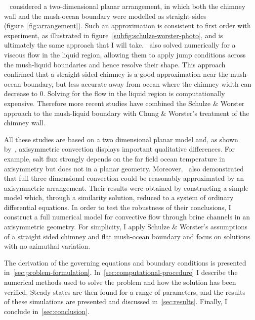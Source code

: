 \documentclass[11pt]{proc}
\begin{document}

~\citet*{schulze-worster-98} considered a two-dimensional planar arrangement, in which both the chimney wall and the mush-ocean boundary were modelled as straight sides (figure~\ref{fig:arrangement}). Such an approximation is consistent to first order with experiment, as illustrated in figure~\ref{subfig:schulze-worster-photo}, and is ultimately the same approach that I will take.~\citet*{chung-worster-02} also solved numerically for a viscous flow in the liquid region, allowing them to apply jump conditions across the mush-liquid boundaries and hence resolve their shape. This approach confirmed that a straight sided chimney is a good approximation near the mush-ocean boundary, but less accurate away from ocean where the chimney width can decrease to $0$. Solving for the flow in the liquid region is computationally expensive. Therefore more recent studies \citep*{wells-et-al-10, wells-et-al-13} have combined the Schulze \& Worster approach to the mush-liquid boundary with Chung \& Worster's treatment of the chimney wall. 

All these studies are based on a two dimensional planar model and, as shown by~\citet*{rees-jones-worster-13}, axisymmetric convection displays important qualitative differences. For example, salt flux strongly depends on the far field ocean temperature in axisymmetry but does not in a planar geometry. Moreover,~\citet*{rees-jones-worster-13} also demonstrated that full three dimensional convection could be reasonably approximated by an axisymmetric arrangement. Their results were obtained by constructing a simple model which, through a similarity solution, reduced to a system of ordinary differential equations. In order to test the robustness of their conclusions, I construct a full numerical model for convective flow through brine channels in an axisymmetric geometry. For simplicity, I apply Schulze \& Worster's assumptions of a straight sided chimney and flat mush-ocean boundary and focus on solutions with no azimuthal variation.

The derivation of the governing equations and boundary conditions is presented in~\autoref{sec:problem-formulation}. In~\autoref{sec:computational-procedure} I describe the numerical methods used to solve the problem and how the solution has been verified. Steady states are then found for a range of parameters, and the results of these simulations are presented and discussed in~\autoref{sec:results}. Finally, I conclude in~\autoref{sec:conclusion}.
\end{document}

